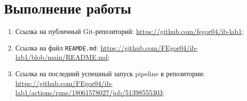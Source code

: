 \section{Выполнение работы}

\begin{enumerate}
    \item Ссылка на публичный Git-репозиторий:
    \url{https://github.com/fegor04/ib-lab1};
    \item Ссылка на файл \texttt{REAMDE.md}:
    \url{https://github.com/FEgor04/ib-lab1/blob/main/README.md};
    \item Ссылка на последний успешный запуск pipeline в репозитории:
    \url{https://github.com/FEgor04/ib-lab1/actions/runs/18061578027/job/51398555303};
\end{enumerate}
